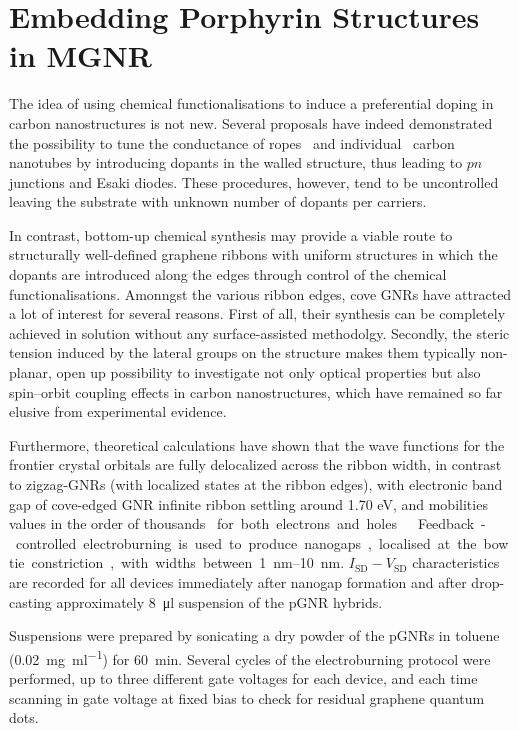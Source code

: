 \section{Embedding Porphyrin Structures in MGNR}\label{gnr-hybrid:sec:measure}

The idea of using chemical functionalisations to induce a preferential doping in carbon nanostructures is not new.
Several proposals have indeed demonstrated the possibility to tune the conductance of ropes~\cite{bockrath2000chemical} and individual~\cite{ zhou2000modulated, ewels2005nitrogen} carbon nanotubes by introducing dopants
in the walled structure, thus leading to $pn$ junctions and Esaki diodes. These procedures, however, tend to be uncontrolled leaving the substrate with unknown number of dopants per carriers.

In contrast, bottom-up chemical synthesis may provide a viable route to structurally well-defined graphene ribbons with uniform structures in which the dopants are introduced along the edges through control of the chemical functionalisations. Amonngst the various ribbon edges, cove GNRs have attracted a lot of interest for several reasons. First of all, their synthesis can be completely achieved in solution without any surface-assisted methodolgy. Secondly, the steric tension induced by the lateral groups on the structure makes them typically non-planar, open up possibility to investigate not only optical properties but also spin--orbit coupling effects in carbon nanostructures, which have remained so far elusive from experimental evidence.

Furthermore, theoretical calculations have shown that the wave functions for the frontier crystal orbitals are fully delocalized across the ribbon width, in contrast to zigzag-GNRs (with localized states at the ribbon edges), with electronic band gap of cove-edged GNR infinite ribbon settling around 1.70 eV, and mobilities values in the order of thousands \si{\cm\square\per\V\per\second} for both electrons and holes~\cite{Liu2015}.

Feedback-controlled electroburning is used to produce nanogaps, localised at the bowtie constriction, with widths between \SIrange{1}{10}{\nano\metre}. $I_\textrm{SD}-V_\textrm{SD}$ characteristics are recorded for all devices immediately after nanogap formation and after drop-casting approximately \SI{8}{\micro\litre} suspension of the \gls{pGNR} hybrids.

Suspensions were prepared by sonicating a dry powder of the \glspl{pGNR} in toluene (\SI{0.02}{\milli\gram\per\milli\litre}) for \SI{60}{\minute}. Several cycles of the electroburning protocol were performed, up to three different gate voltages for each device, and each time scanning in gate voltage at fixed bias to check for residual graphene quantum dots.

